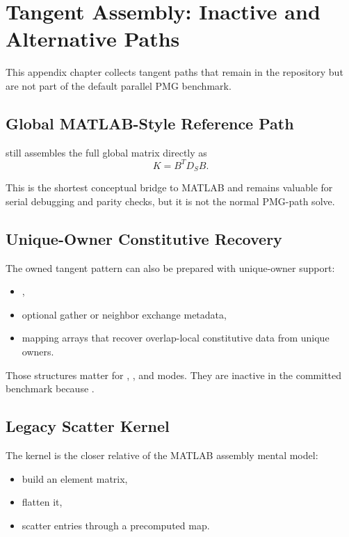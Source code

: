 \chapter{Tangent Assembly: Inactive and Alternative Paths}
\label{app:tangent}

This appendix chapter collects tangent paths that remain in the repository but
are not part of the default parallel PMG benchmark.

\section{Global MATLAB-Style Reference Path}

 still assembles the full global
matrix directly as
\[
K = B^T D_S B.
\]

This is the shortest conceptual bridge to MATLAB and remains valuable for
serial debugging and parity checks, but it is not the normal PMG-path solve.

\section{Unique-Owner Constitutive Recovery}

The owned tangent pattern can also be prepared with unique-owner support:
\begin{itemize}
\item {},
\item optional gather or neighbor exchange metadata,
\item mapping arrays that recover overlap-local constitutive data from unique
owners.
\end{itemize}

Those structures matter for , , and
 modes. They are inactive in the committed benchmark
because .

\section{Legacy Scatter Kernel}

The  kernel is the closer relative of the MATLAB assembly mental
model:
\begin{itemize}
\item build an element matrix,
\item flatten it,
\item scatter entries through a precomputed map.
\end{itemize}

